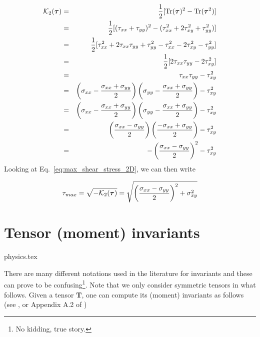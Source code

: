 \begin{eqnarray}
{\cal K}_2({\bm \tau}) 
&=& \frac{1}{2}[{\rm Tr}({\bm \tau}) ^2 - {\rm Tr}({\bm \tau}^2)] \nonumber\\
&=& \frac{1}{2}[ (\tau_{xx}+\tau_{yy})^2 - (\tau_{xx}^2+2\tau_{xy}^2+\tau_{yy}^2)] \nonumber\\
&=& \frac{1}{2}[ \tau_{xx}^2+2\tau_{xx}\tau_{yy} +\tau_{yy}^2 - \tau_{xx}^2-2\tau_{xy}^2-\tau_{yy}^2] \nonumber\\
&=& \frac{1}{2}[ 2\tau_{xx}\tau_{yy} -2\tau_{xy}^2] \nonumber\\
&=& \tau_{xx}\tau_{yy} -\tau_{xy}^2 \nonumber\\
&=& \left(\sigma_{xx}-\frac{\sigma_{xx}+\sigma_{yy}}{2}\right)
\left(\sigma_{yy}-\frac{\sigma_{xx}+\sigma_{yy}}{2}\right)
-\tau_{xy}^2 \nonumber\\
&=& \left(\sigma_{xx}-\frac{\sigma_{xx}+\sigma_{yy}}{2}\right)
\left(\sigma_{yy}-\frac{\sigma_{xx}+\sigma_{yy}}{2}\right)
-\tau_{xy}^2 \nonumber\\
&=& \left(\frac{\sigma_{xx}-\sigma_{yy}}{2}\right)
\left(\frac{-\sigma_{xx}+\sigma_{yy}}{2}\right)
-\tau_{xy}^2 \nonumber\\
&=& -\left(\frac{\sigma_{xx}-\sigma_{yy}}{2}\right)^2
-\tau_{xy}^2 \nonumber
\end{eqnarray}
Looking at Eq.~\eqref{eq:max_shear_stress_2D}, we can then write
\begin{mdframed}[backgroundcolor=blue!5]
\[
\tau_{max}= \sqrt{-{\cal K}_2(\bm\tau)}
=\sqrt{ \left(\frac{\sigma_{xx}-\sigma_{yy}}{2}\right)^2 +\sigma_{xy}^2 }
\]
\end{mdframed}


\section{Tensor (moment) invariants}\label{sec:invariants}
\begin{flushright} {\tiny {\color{gray} physics.tex}} \end{flushright}


There are many different notations used in the literature for invariants 
and these can prove to be 
confusing\footnote{No kidding, true story.}. Note that we only consider symmetric tensors in what follows.
Given a tensor $\bm{T}$,  one can compute its (moment) invariants as follows 
(see \cite[p.339]{reddybook2}, or Appendix A.2 of \cite{zita2})

